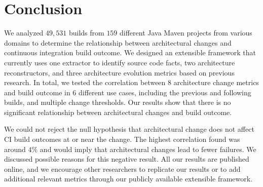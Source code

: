 \documentclass[sigconf, anonymous, review]{acmart}
\begin{document}
\section{Conclusion}

We analyzed $49,531$ builds from $159$ different Java Maven projects from various domains to determine the relationship between architectural changes and continuous integration build outcome.
We designed an extensible framework that currently uses one extractor to identify source code facts, two architecture reconstructors, and three architecture evolution metrics based on previous research.
In total, we tested the correlation between $8$ architecture change metrics and build outcome in $6$ different use cases, including the previous and following builds, and multiple change thresholds.
Our results show that there is no significant relationship between architectural changes and build outcome.

We could not reject the null hypothesis that architectural change does not affect CI build outcomes at or near the change. The highest correlation found was around $4\%$ and would imply that architectural changes lead to fewer failures. 
We discussed possible reasons for this negative result.
All our results are published online, and we encourage other researchers to replicate our results or to add additional relevant metrics through our publicly available extensible framework.



\end{document}

